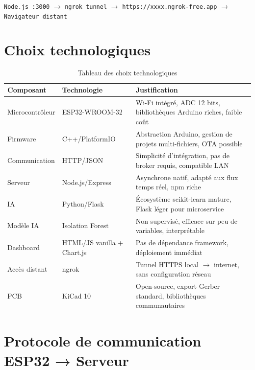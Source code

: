\documentclass[12pt,a4paper]{report}
\newcommand{\code}[1]{\texttt{\small\colorbox{codebg}{#1}}}
\begin{document}
\begin{center}
\small
\code{Node.js :3000} $\longrightarrow$ \code{ngrok tunnel} $\longrightarrow$
\code{https://xxxx.ngrok-free.app} $\longrightarrow$ \code{Navigateur distant}
\end{center}

\section{Choix technologiques}

\begin{table}[H]
\centering
\caption{Tableau des choix technologiques}
\label{tab:techno}
\begin{tabularx}{\textwidth}{@{}L{3cm}L{3.5cm}L{7cm}@{}}
\toprule
\textbf{Composant} & \textbf{Technologie} & \textbf{Justification} \\
\midrule
Microcontrôleur & ESP32-WROOM-32 & Wi-Fi intégré, ADC 12 bits, bibliothèques Arduino riches, faible coût~\cite{lin2021aqua} \\
\addlinespace
Firmware & C++/PlatformIO & Abstraction Arduino, gestion de projets multi-fichiers, OTA possible \\
\addlinespace
Communication & HTTP/JSON & Simplicité d'intégration, pas de broker requis, compatible LAN \\
\addlinespace
Serveur & Node.js/Express & Asynchrone natif, adapté aux flux temps réel, npm riche \\
\addlinespace
IA & Python/Flask & Écosystème scikit-learn mature, Flask léger pour microservice \\
\addlinespace
Modèle IA & Isolation Forest & Non supervisé, efficace sur peu de variables, interprétable~\cite{liu2008isolation} \\
\addlinespace
Dashboard & HTML/JS vanilla + Chart.js & Pas de dépendance framework, déploiement immédiat \\
\addlinespace
Accès distant & ngrok & Tunnel HTTPS local $\rightarrow$ internet, sans configuration réseau \\
\addlinespace
PCB & KiCad 10 & Open-source, export Gerber standard, bibliothèques communautaires \\
\bottomrule
\end{tabularx}
\end{table}

\section{Protocole de communication ESP32 → Serveur}
\end{document}

